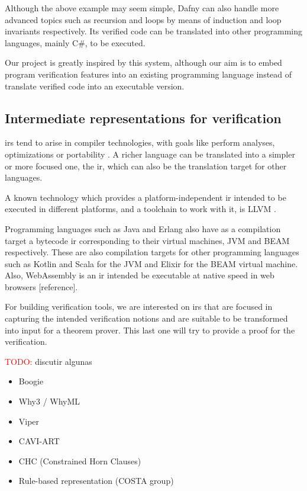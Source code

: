 Although the above example may seem simple, Dafny can also handle more advanced topics such as recursion 
and loops by means of induction and loop invariants respectively. Its verified code can be translated into 
other programming languages, mainly C\#, to be executed. 

Our project is greatly inspired by this system, although our aim is to embed program verification features 
into an existing programming language instead of translate verified code into an executable version.

\subsection{Intermediate representations for verification}

\gls{ir}s tend to arise in compiler technologies, with goals like perform analyses, optimizations or 
portability \citep{FormalizingLLVMIR}. A richer language can be translated into a simpler or more focused
one, the \gls{ir}, which can also be the translation target for other languages.

A known technology which provides a platform-independent \gls{ir} intended to be executed in 
different platforms, and a toolchain to work with it, is LLVM \citep{LLVM}.

Programming languages such as Java and Erlang also have as a compilation target a bytecode \gls{ir} 
corresponding to their virtual machines, JVM and BEAM respectively. These are also compilation targets 
for other programming languages such as Kotlin and Scala for the JVM and Elixir for the BEAM virtual
machine. Also, WebAssembly is an \gls{ir} intended be executable at native speed in web browsers [reference].

For building verification tools, we are interested on \gls{ir}s that are focused in capturing the 
intended verification notions and are suitable to be transformed into input for a theorem prover.
This last one will try to provide a proof for the verification.

\textcolor{red}{TODO:} discutir algunas

\begin{itemize}
  \item Boogie
  \item Why3 / WhyML
  \item Viper
  \item CAVI-ART
  \item CHC (Constrained Horn Clauses)
  \item Rule-based representation (COSTA group)
\end{itemize}

